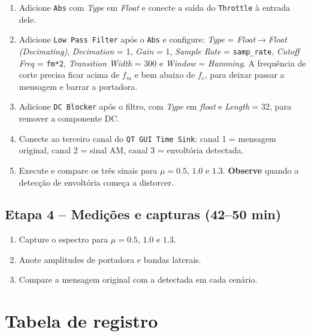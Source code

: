 \documentclass[11pt,a4paper]{article}
\begin{document}
\begin{instrucao}
\begin{enumerate}[label=\arabic*.]
  \item Adicione \texttt{Abs} com \textit{Type} em \textit{Float} e conecte a
    saída do \texttt{Throttle} à entrada dele.
  \item Adicione \texttt{Low Pass Filter} após o \texttt{Abs} e configure:
    \textit{Type} = \textit{Float}$\to$\textit{Float (Decimating)},
    \textit{Decimation} = 1, \textit{Gain} = 1,
    \textit{Sample Rate} = \texttt{samp\_rate},
    \textit{Cutoff Freq} = \texttt{fm*2},
    \textit{Transition Width} = 300 e \textit{Window} = \textit{Hamming}.
    A frequência de corte precisa ficar acima de $f_m$ e bem abaixo de $f_c$,
    para deixar passar a mensagem e barrar a portadora.
  \item Adicione \texttt{DC Blocker} após o filtro, com \textit{Type} em
    \textit{float} e \textit{Length} = 32, para remover a componente DC.
  \item Conecte ao terceiro canal do \texttt{QT GUI Time Sink}:
    canal 1 = mensagem original, canal 2 = sinal AM, canal 3 = envoltória
    detectada.
  \item Execute e compare os três sinais para $\mu = 0.5$, $1.0$ e $1.3$.
    \textbf{Observe} quando a detecção de envoltória começa a distorcer.
\end{enumerate}
\end{instrucao}

\subsection*{Etapa 4 -- Medições e capturas (42--50 min)}

\begin{enumerate}[label=\arabic*.]
  \item Capture o espectro para $\mu = 0.5$, $1.0$ e $1.3$.
  \item Anote amplitudes de portadora e bandas laterais.
  \item Compare a mensagem original com a detectada em cada cenário.
\end{enumerate}

\section{Tabela de registro}
\end{document}
